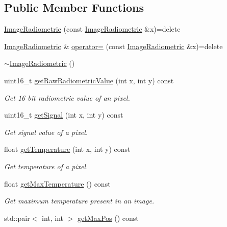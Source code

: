 \subsection*{Public Member Functions}
\begin{DoxyCompactItemize}
\item 
\hyperlink{classwtl_1_1_image_radiometric_a2d44ad864d81d556cd4909ad064a2809}{Image\+Radiometric} (const \hyperlink{classwtl_1_1_image_radiometric}{Image\+Radiometric} \&x)=delete
\item 
\hyperlink{classwtl_1_1_image_radiometric}{Image\+Radiometric} \& \hyperlink{classwtl_1_1_image_radiometric_aec1dfb43a074a912824fbf875e849040}{operator=} (const \hyperlink{classwtl_1_1_image_radiometric}{Image\+Radiometric} \&x)=delete
\item 
\hyperlink{classwtl_1_1_image_radiometric_ac82e2b4d611ef6c1386e18d1f91bb9dc}{$\sim$\+Image\+Radiometric} ()
\item 
uint16\+\_\+t \hyperlink{classwtl_1_1_image_radiometric_a54944b28818ee3d347f9b462744d0e49}{get\+Raw\+Radiometric\+Value} (int x, int y) const
\begin{DoxyCompactList}\small\item\em Get 16 bit radiometric value of an pixel. \end{DoxyCompactList}\item 
uint16\+\_\+t \hyperlink{classwtl_1_1_image_radiometric_a4e4591e2af9b3bc9d553bc991df68e2b}{get\+Signal} (int x, int y) const
\begin{DoxyCompactList}\small\item\em Get signal value of a pixel. \end{DoxyCompactList}\item 
float \hyperlink{classwtl_1_1_image_radiometric_aafdb4f226d077b561cf429d55451d9d1}{get\+Temperature} (int x, int y) const
\begin{DoxyCompactList}\small\item\em Get temperature of a pixel. \end{DoxyCompactList}\item 
float \hyperlink{classwtl_1_1_image_radiometric_a2d1922ffa3030f0344a7e1abf90a524d}{get\+Max\+Temperature} () const
\begin{DoxyCompactList}\small\item\em Get maximum temperature present in an image. \end{DoxyCompactList}\item 
std\+::pair$<$ int, int $>$ \hyperlink{classwtl_1_1_image_radiometric_ae1bdd0fb2335a6482ff3656dd8e9f7a3}{get\+Max\+Pos} () const

\end{DoxyCompactItemize}
